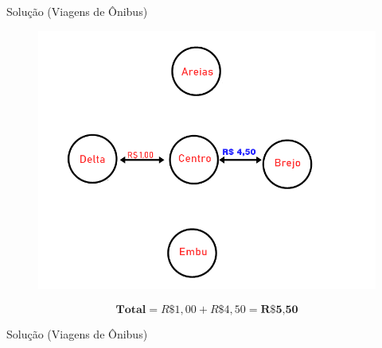 \documentclass{beamer}
\begin{document}
\begin{frame}{Solução (Viagens de Ônibus)}
\begin{figure}[ht]
\centering
\includegraphics[width=.8\textwidth]{DB3.png}
\label{fig:exampleFig2}
\end{figure}
\begin{equation*}
    \textbf{Total} = R\$1,00 + R\$4,50 = \textbf{R\$5,50}
\end{equation*}

\end{frame}
\begin{frame}{Solução (Viagens de Ônibus)}


\end{frame}
\end{document}
